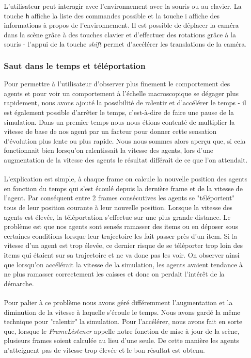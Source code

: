 L'utilisateur peut interagir avec l'environnement avec la souris ou au
clavier. La touche \verb!h! affiche la liste des commandes possible et la
touche i affiche des informations à propos de l'environnement.
Il est possible de déplacer la caméra dans la scène grâce à des touches
clavier et d'effectuer des rotations grâce à la souris - l'appui de la touche
\emph{shift} permet d'accélérer les translations de la caméra.

\subsubsection{Saut dans le temps et téléportation}
Pour permettre à l'utilisateur d'observer plus finement le comportement des
agents et pour voir un comportement à l'échelle macroscopique se dégager plus
rapidement, nous avons ajouté la possibilité de ralentir et d'accélérer le
temps - il est également possible d'arrêter le temps, c'est-à-dire de faire
une pause de la simulation. Dans un premier temps nous nous étions contenté de
multiplier la vitesse de base de nos agent par un facteur pour donner cette
sensation d'évolution plus lente ou plus rapide. Nous nous sommes alors aperçu
que, si cela fonctionnait bien lorsqu'on ralentissait la vitesse des agents,
lors d'une augmentation de la vitesse des agents le résultat différait de ce
que l'on attendait.

\paragraph{}
L'explication est simple, à chaque frame on calcule la nouvelle position des
agents en fonction du temps qui s'est écoulé depuis la dernière frame et de la
vitesse de l'agent. Par conséquent entre 2 frames consécutives les agents se
"téléportent" tous de leur position courante à leur nouvelle position. Lorsque
la vitesse des agents est élevée, la téléportation s'effectue sur une plus
grande distance. Le problème est que nos agents sont sensés ramasser des items
ou en déposer sous certaines conditions lorsque leur trajectoire les fait
passer près d'un item. Si la vitesse d'un agent est trop élevée, ce dernier
risque de se téléporter trop loin des items qui étaient sur sa trajectoire et
ne va donc pas les voir. On observer ainsi que lorsqu'on accélérait la vitesse
de la simulation, les agents avaient tendance à ne plus ramasser correctement
les caisses et donc on perdait l'intérêt de la démarche.

\paragraph{}
Pour palier à ce problème nous avons géré différemment l'augmentation et la
diminution de la vitesse à laquelle s'écoule le temps. Nous avons gardé la
même technique pour "ralentir" la simulation. Pour l'accélérer, nous avons
fait en sorte que, lorsque le \emph{FrameListener} appelle notre fonction de
mise à jour de la scène, plusieurs frames soient calculée au lieu d'une seule.
De cette manière les agents n'atteignent pas de vitesse trop élevée et le bon
résultat est obtenu.

